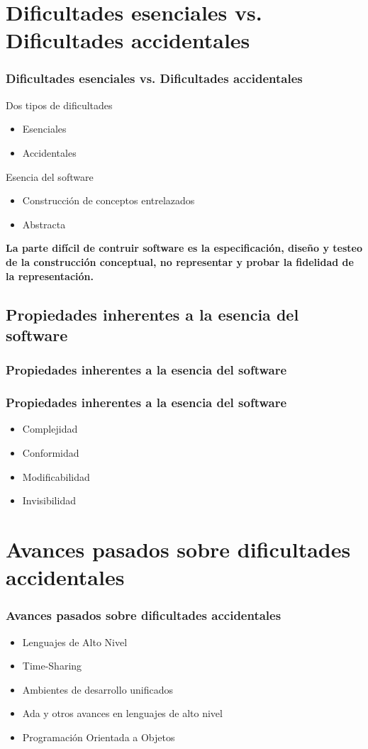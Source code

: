 \documentclass{beamer}
\begin{document}
\section{Dificultades esenciales vs. Dificultades accidentales}
\begin{frame}
\frametitle{Dificultades esenciales vs. Dificultades accidentales}

Dos tipos de dificultades
  \begin{itemize}
    \item Esenciales
    \item Accidentales
  \end{itemize}

Esencia del software
  \begin{itemize}
	  \item Construcción de conceptos entrelazados
	  \item Abstracta
  \end{itemize}

\textbf{La parte difícil de contruir software es la especificación, diseño y testeo de la construcción conceptual, no representar y probar la fidelidad de la representación.}
\end{frame}

\subsection{Propiedades inherentes a la esencia del software}
\frametitle{Propiedades inherentes a la esencia del software}
\begin{frame}
\frametitle{Propiedades inherentes a la esencia del software}
\begin{itemize}
  \item Complejidad
  \item Conformidad
  \item Modificabilidad
  \item Invisibilidad
\end{itemize}
\end{frame}

\section{Avances pasados sobre dificultades accidentales}
\begin{frame}
\frametitle{Avances pasados sobre dificultades accidentales}
\begin{itemize}
  \item Lenguajes de Alto Nivel
  \item Time-Sharing
  \item Ambientes de desarrollo unificados
  \item Ada y otros avances en lenguajes de alto nivel
  \item Programación Orientada a Objetos
\end{itemize}
\end{frame}
\end{document}
